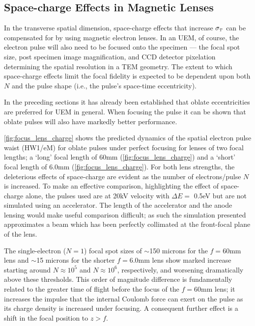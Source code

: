 \subsection{Space-charge Effects in Magnetic Lenses} \label{sec:mag_lens_charge}

In the transverse spatial dimension, space-charge effects that increase $ \sigma_{ {\scriptscriptstyle T} } $ can be compensated for by using magnetic electron lenses.\cite{oudheusden_electron_2007,lagrange_nanosecond_2008}
In an UEM, of course, the electron pulse will also need to be focused onto the specimen --- the focal spot size, post specimen image magnification, and CCD detector pixelation determining the spatial resolution in a TEM geometry.\cite{berger_dc_2009}
The extent to which space-charge effects limit the focal fidelity is expected to be dependent upon both $N$ and the pulse shape (i.e., the pulse's space-time eccentricity).

In the preceding sections it has already been established that oblate eccentricities are preferred for UEM in general.
When focusing the pulse it can be shown that oblate pulses will also have markedly better performance.



\ref{fig:focus_lens_charge} shows the predicted dynamics of the spatial electron pulse waist (HW1/eM) for oblate pulses under perfect focusing for lenses of two focal lengths; a `long' focal length of 60mm (\ref{fig:focus_lens_charge}) and a `short' focal length of 6.0mm (\ref{fig:focus_lens_charge}).
For both lens strengths, the deleterious effects of space-charge are evident as the number of electrons/pulse $ N $ is increased.
To make an effective comparison, highlighting the effect of space-charge alone, the pulses used are at 20kV velocity with $\Delta E = $ 0.5eV but are not simulated using an accelerator.
The length of the accelerator and the anode lensing would make useful comparison difficult; as such the simulation presented approximates a beam which has been perfectly collimated at the front-focal plane of the lens.

The single-electron ($ N = 1 $) focal spot sizes of $\sim$150 microns for the $ f = 60 \text{mm} $ lens and $\sim$15 microns for the shorter $ f = 6.0 \text{mm} $ lens show marked increase starting around $ N \approx 10^{ 5 } $ and $ N \approx 10^{ 6 }$, respectively, and worsening dramatically above these thresholds.
This order of magnitude difference is fundamentally related to the greater time of flight before the focus of the $ f = 60\text{mm} $ lens; it increases the impulse that the internal Coulomb force can exert on the pulse as its charge density is increased under focusing.
A consequent further effect is a shift in the focal position to $ z > f $.

